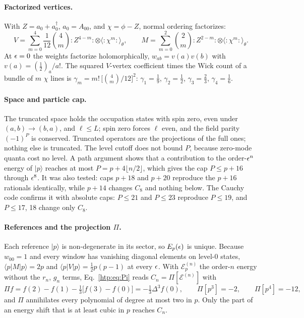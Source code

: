 \paragraph{Factorized vertices.} With $Z=a_0+a_0^\dagger$, $a_0=A_{00}$, and $\chi=\phi-Z$, normal ordering factorizes:
\begin{equation}
 V=\sum_{m=0}^4\frac1{12}\binom4m{:}Z^{4-m}{:}\otimes\langle{:}\chi^m{:}\rangle_\theta,\qquad
 M=\sum_{m=0}^2\binom2m{:}Z^{2-m}{:}\otimes\langle{:}\chi^m{:}\rangle_\theta .
 \label{htp:d2:eq:factorize}
\end{equation}
At $\epsilon=0$ the weights factorize holomorphically, $w_{ab}=v(a)v(b)$ with $v(a)=(\frac12)_a/a!$. The squared
$V$-vertex coefficient times the Wick count of a bundle of $m$ $\chi$ lines is
$\gamma_m=m!\,\big[\binom4m/12\big]^2$: $\gamma_1=\frac19$, $\gamma_2=\frac12$, $\gamma_3=\frac23$, $\gamma_4=\frac16$.

\paragraph{Space and particle cap.} The truncated space holds the occupation states with spin zero, even under
$(a,b)\to(b,a)$, and $\ell\le L$; spin zero forces $\ell$ even, and the field parity $(-1)^P$ is conserved. Truncated
operators are the projections of the full ones; nothing else is truncated. The level cutoff does not bound $P$, because
zero-mode quanta cost no level. A path argument shows that a contribution to the order-$\epsilon^n$ energy of $|p\rangle$
reaches at most $P=p+4\lfloor n/2\rfloor$, which gives the cap $P\le p+16$ through $\epsilon^8$. It was also tested: caps
$p+18$ and $p+20$ reproduce the $p+16$ rationals identically, while $p+14$ changes $C_8$ and nothing below. The Cauchy
code confirms it with absolute caps: $P\le21$ and $P\le23$ reproduce $P\le19$, and $P\le17$, 18 change only $C_8$.

\paragraph{References and the projection $\Pi$.} Each reference $|p\rangle$ is non-degenerate in its sector, so $E_p(\epsilon)$
is unique. Because $w_{00}=1$ and every window has vanishing diagonal elements on level-0 states, $\langle p|M|p\rangle=2p$ and
$\langle p|V|p\rangle=\frac12p(p-1)$ at every $\epsilon$. With $\mathcal E_p^{(n)}$ the order-$n$ energy without the $r_n$,
$g_n$ terms, Eq.~\eqref{htp:eq:Pi} reads $C_n=\Pi[\mathcal E^{(n)}]$ with
\begin{equation}
 \Pi f=f(2)-f(1)-\tfrac13\big[f(3)-f(0)\big]=-\tfrac13\Delta^3f(0),\qquad \Pi[p^3]=-2,\qquad \Pi[p^4]=-12 ,
 \label{htp:d2:eq:Pi}
\end{equation}
and $\Pi$ annihilates every polynomial of degree at most two in $p$. Only the part of an energy shift that is at least
cubic in $p$ reaches $C_n$.

